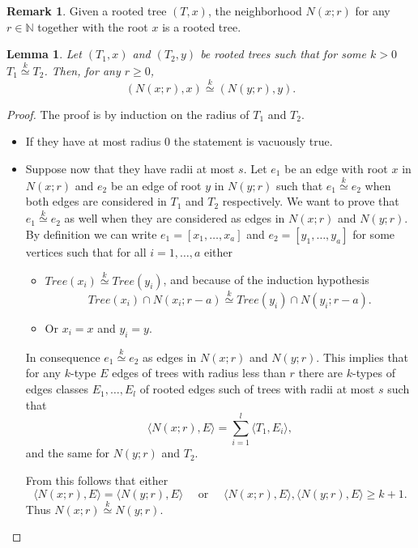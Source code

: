 \documentclass[11pt,notitlepage,a4paper]{article}
\newtheorem{lemma}{Lemma}[section]
\theoremstyle{definition}
\newtheorem{remark}{Remark}[section]
\newcommand{\N}{\mathbb{N}}
\newcommand{\morph}[1]{\stackrel{#1}{\simeq}}
\begin{document}
\begin{remark}
	Given a rooted tree $(T,x)$, the neighborhood $N(x;r)$ for any $r\in \N$
	together with the root $x$ is a rooted tree.
\end{remark}


\begin{lemma}\label{lem:radiustree}
	Let $(T_1,x)$ and $(T_2,y)$ be rooted trees such that for some $k>0$ 
	$T_1 \morph{k} T_2$. Then, for any $r\geq 0$, 
	\[(N(x;r),x)\morph{k} (N(y;r),y).\]
\end{lemma}
\begin{proof}
	The proof is by induction on the radius of $T_1$ and $T_2$.
	\begin{itemize}[leftmargin=*]
		\item If they have at most radius $0$ the statement is vacuously true. 
		\item Suppose now that they have radii at most $s$. Let $e_1$ be an edge with root
		$x$ in $N(x;r)$ and $e_2$ be an edge of root $y$ in $N(y;r)$ such that $e_1 \morph{k} e_2$
		when both edges are considered in $T_1$ and $T_2$ respectively. We want to prove that
		$e_1 \morph{k} e_2$ as well when they are considered as edges in $N(x;r)$ and $N(y;r)$.
		By definition we can write $e_1=[x_1,\dots,x_a]$ and 
		$e_2=[y_1,\dots,y_a]$ for some vertices such that for all
		$i=1,\dots, a$ either 
		\begin{itemize}
			\item $Tree(x_i)\morph{k} Tree(y_i)$, and because of the induction hypothesis 
			\[Tree(x_i)\cap N(x_i;r-a) \morph{k} Tree(y_i)\cap N(y_i;r-a).\] 
			\item Or $x_i=x$ and $y_i=y$.
		\end{itemize}
		In consequence $e_1 \morph{k} e_2$ as edges in $N(x;r)$ and $N(y;r)$. 
		This implies that for any $k$-type $E$ edges of trees with
		radius less than $r$ there are $k$-types of edges classes 
		$E_1,\dots,E_l$ of rooted edges such
		of trees with radii at most $s$ such that
		\[ \langle N(x;r),E \rangle =  \sum_{i=1}^{l}\langle T_1, E_i\rangle ,\]
		and the same for $N(y;r)$ and $T_2$.\par
		From this follows that either
		\[ \langle N(x;r),E \rangle =\langle N(y;r),E \rangle \quad
		\text{ or } \quad  
		\langle N(x;r),E \rangle,
		\langle N(y;r),E \rangle \geq k+1. \]
		Thus $N(x;r)\morph{k} N(y;r)$.
	\end{itemize}	
\end{proof}
\end{document}
